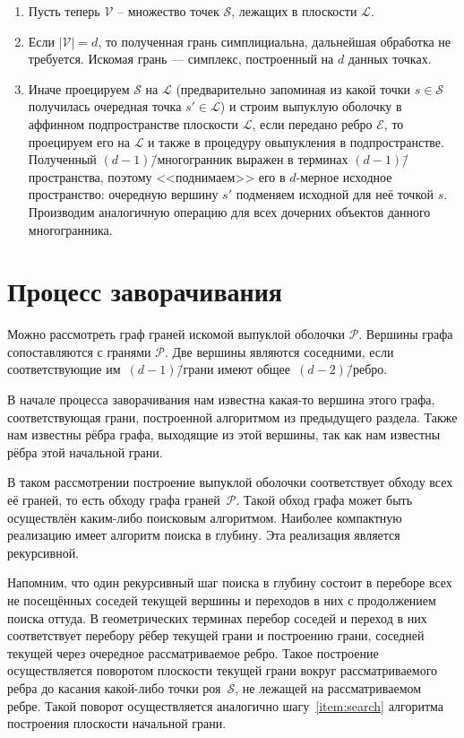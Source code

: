 \documentclass[a4paper,12pt]{article}
\newcommand{\Swarm}{\mathcal{S}}              %
\newcommand{\Polyhedron}{\mathcal{P}}         %
\newcommand{\Edge}{\mathcal{E}}               %
\newcommand{\Viewed}{\mathcal{V}}             %
\newcommand{\Plane}{\mathcal{L}}           %
\renewcommand{\.}{\hspace{0.2ex}}
\begin{document}
    \begin{enumerate}
      \item Пусть теперь $\Viewed$ -- множество точек $\Swarm$, лежащих в плоскости $\Plane$.
      \item Если $|\Viewed| = d$, то полученная грань симплициальна, дальнейшая обработка не требуется. Искомая грань --- симплекс, построенный на $d$ данных точках.
      \item Иначе проецируем $\Swarm$ на $\Plane$ (предварительно запоминая из какой точки $s \in \Swarm$ получилась очередная точка $s' \in \Plane$) и строим выпуклую оболочку в аффинном подпространстве плоскости $\Plane$, если передано ребро $\Edge$, то проецируем его на $\Plane$ и также в процедуру овыпукления в подпространстве. Полученный $(d-1)$\=/многогранник выражен в терминах $(d-1)$\=/пространства, поэтому <<поднимаем>> его в $d$-мерное исходное пространство: очередную вершину $s'$ подменяем исходной для неё точкой $s$. Производим аналогичную операцию для всех дочерних объектов данного многогранника.
    \end{enumerate}


\section{Процесс заворачивания}
  Можно рассмотреть граф граней искомой выпуклой оболочки $\Polyhedron$. Вершины графа сопоставляются с гранями $\Polyhedron$. Две вершины являются соседними, если соответствующие им~$(d-1)$\=/грани имеют общее~$(d-2)$\=/ребро.

  В начале процесса заворачивания нам известна какая-то вершина этого графа, соответствующая грани, построенной алгоритмом из предыдущего раздела. Также нам известны рёбра графа, выходящие из этой вершины, так как нам известны рёбра этой начальной грани.

  В таком рассмотрении построение выпуклой оболочки соответствует обходу всех её граней, то есть обходу графа граней~$\Polyhedron$. Такой обход графа может быть осуществлён каким-либо поисковым алгоритмом. Наиболее компактную реализацию имеет алгоритм поиска в глубину. Эта реализация является рекурсивной.

  Напомним, что один рекурсивный шаг поиска в глубину состоит в переборе всех не посещённых соседей текущей вершины и переходов в них с продолжением поиска оттуда. В геометрических терминах перебор соседей и переход в них соответствует перебору рёбер текущей грани и построению грани, соседней текущей через очередное рассматриваемое ребро. Такое построение осуществляется поворотом плоскости текущей грани вокруг рассматриваемого ребра до касания какой-либо точки роя~$\Swarm$, не лежащей на рассматриваемом ребре. Такой поворот осуществляется аналогично шагу~\ref{item:search} алгоритма построения плоскости начальной грани.
\end{document}

